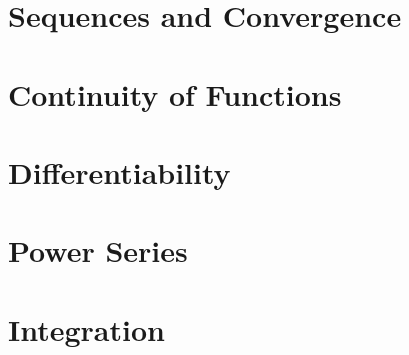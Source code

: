 \documentclass[british,11pt,a4paper]{report}
\begin{document}
\maketitle
\tableofcontents
\chapter{Sequences and Convergence}

\chapter{Continuity of Functions}

\chapter{Differentiability}

\chapter{Power Series}

\chapter{Integration}

\end{document}
